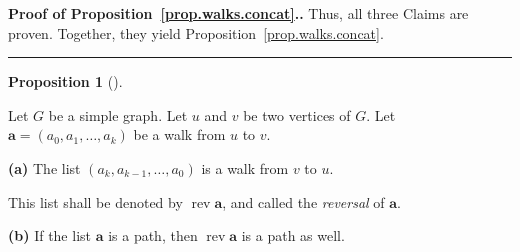 \documentclass[numbers=enddot,12pt,final,onecolumn,notitlepage]{scrartcl}%
\theoremstyle{definition}
\newtheorem{prop}[theo]{Proposition}
\newenvironment{proposition}[1][]
{\begin{prop}[#1]\begin{leftbar}}
{\end{leftbar}\end{prop}}
\newenvironment{proof}[1][Proof]{\noindent\textbf{#1.} }{\ \rule{0.5em}{0.5em}}
\newcommand{\rev}{\operatorname{rev}}
\newcommand{\tup}[1]{\left( #1 \right)}
\begin{document}
\begin{proof}[Proof of Proposition~\ref{prop.walks.concat}.]
Thus, all three Claims are proven. Together, they yield 
Proposition~\ref{prop.walks.concat}.
\end{proof}

\begin{proposition} \label{prop.walks.rev}
Let $G$ be a simple graph. Let $u$ and $v$ be two vertices of $G$.
Let $\mathbf{a} = \tup{a_0, a_1, \ldots, a_k}$ be a walk from $u$ to
$v$.

\textbf{(a)} The list $\tup{a_k, a_{k-1}, \ldots, a_0}$ is a walk
from $v$ to $u$.

This list shall be denoted by $\rev \mathbf{a}$, and called the
\textit{reversal} of $\mathbf{a}$.

\textbf{(b)} If the list $\mathbf{a}$ is a path, then
$\rev \mathbf{a}$ is a path as well.
\end{proposition}
\end{document}
